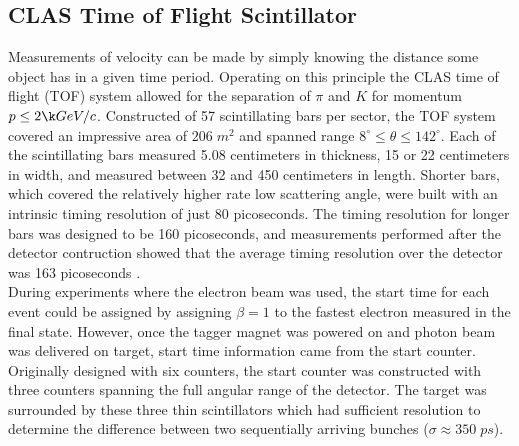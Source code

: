 \subsection{CLAS Time of Flight Scintillator}
Measurements of velocity can be made by simply knowing the distance some object has in a given time period.  Operating on this principle the CLAS time of flight (TOF) system allowed for the separation of $\pi$ and $K$ for momentum $p \leq 2 \k GeV/c$.  Constructed of 57 scintillating bars per sector, the TOF system covered an impressive area of $206 \; m^2$ and spanned range $8^\circ \leq \theta \leq 142^\circ$.  Each of the scintillating bars measured 5.08 centimeters in thickness, 15 or 22 centimeters in width, and measured between 32 and 450 centimeters in length.  Shorter bars, which covered the relatively higher rate low scattering angle, were built with an intrinsic timing resolution of just 80 picoseconds.  The timing resolution for longer bars was designed to be 160 picoseconds, and measurements performed after the detector contruction showed that the average timing resolution over the detector was 163 picoseconds \cite{hardware-smith:1999}.\\
During experiments where the electron beam was used, the start time for each event could be assigned by assigning $\beta = 1$ to the fastest electron measured in the final state.  However, once the tagger magnet was powered on and photon beam was delivered on target, start time information came from the start counter.  Originally designed with six counters, the start counter was constructed with three counters spanning the full angular range of the detector.  The target was surrounded by these three thin scintillators which had sufficient resolution to determine the difference between two sequentially arriving bunches ($\sigma \approx 350 \; ps$). 


